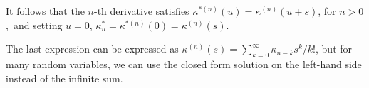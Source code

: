 \documentclass[fleqn]{amsart}
\theoremstyle{definition}
\begin{document}
It follows that the \(n\)-th derivative satisfies
\(\kappa^{*(n)}(u) = \kappa^{(n)}(u + s)\), for \(n > 0\),\
and setting $u=0$, \(\kappa^*_n = \kappa^{*(n)}(0) = \kappa^{(n)}(s)\).

The last expression can be expressed as \(\kappa^{(n)}(s) =
\sum_{k=0}^\infty \kappa_{n - k} s^k/k!\), but for many random variables,
we can use the closed form solution on the left-hand side instead of
the infinite sum.

%
%

%
\end{document}
